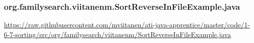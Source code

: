 \vspace{1em}
\subsubsection*{org.familysearch.viitanenm.SortReverseInFileExample.java}
\noindent
\begin{minipage}{.6in}
\end{minipage}
\begin{minipage}{6in}
  \url{https://raw.githubusercontent.com/mviitanen/ati-java-apprentice/master/code/1-6-7-sorting/src/org/familysearch/viitanenm/SortReverseInFileExample.java}
\end{minipage}